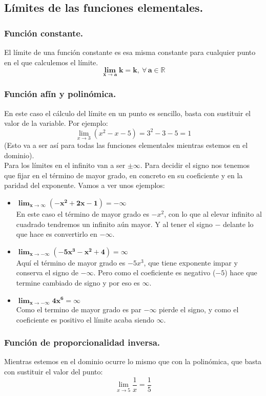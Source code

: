 \documentclass[a4paper,11pt,answers]{exam}
\begin{document}
\subsection{Límites de las funciones elementales.}
\subsubsection{Función constante.}
El límite de una función constante es esa misma constante para cualquier punto en el que calculemos el límite.
\[\boldsymbol{\lim_{x \to a} k = k,\ \forall\,a \in \mathbb{R}}\]

\subsubsection{Función afín y polinómica.}
En este caso el cálculo del límite en un punto es sencillo, basta con sustituir el valor de la variable. Por ejemplo:
\[\lim_{x \to 3} (x^2 - x -5) = 3^2 - 3 - 5 = 1\]
(Esto va a ser así para todas las funciones elementales mientras estemos en el dominio).\\

Para los límites en el infinito van a ser $\pm\infty$. Para decidir el signo nos tenemos que fijar en el término de mayor grado, en concreto en su coeficiente y en la paridad del exponente. Vamos a ver unos ejemplos:
\begin{itemize}
	\item $\boldsymbol{\lim_{x \to \infty} (-x^2 + 2x - 1) = -\infty}$\\
	En este caso el término de mayor grado es $-x^2$, con lo que al elevar infinito al cuadrado tendremos un infinito aún mayor. Y al tener el signo $-$ delante lo que hace es convertirlo en $-\infty$.
	
	\item $\boldsymbol{\lim_{x \to -\infty} (-5x^3 - x^2 + 4) = \infty}$\\
	Aquí el término de mayor grado es $-5x^3$, que tiene exponente impar y conserva el signo de $-\infty$. Pero como el coeficiente es negativo ($-5$) hace que termine cambiado de signo y por eso es $\infty$.
	
	\item $\boldsymbol{\lim_{x \to -\infty} 4x^6 = \infty}$\\
	Como el termino de mayor grado es par $-\infty$ pierde el signo, y como el coeficiente es positivo el límite acaba siendo $\infty$.
\end{itemize}
\subsubsection{Función de proporcionalidad inversa.}
Mientras estemos en el dominio ocurre lo mismo que con la polinómica, que basta con sustituir el valor del punto:
\[\lim_{x \to 5} \frac{1}{x} = \frac{1}{5}\]
\end{document}
